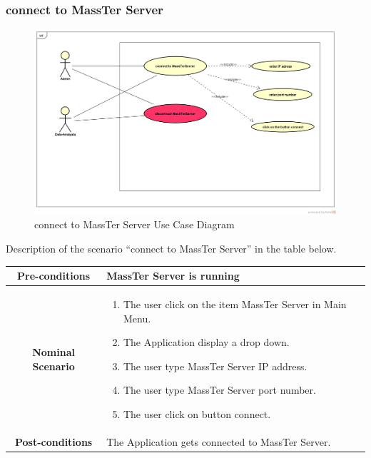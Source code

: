 \documentclass[12pt]{article}
\begin{document}
	 \subsubsection{connect to MassTer Server}
	 	\begin{figure}[h]
	 	\centering
	 	\includegraphics[width=1.0\textwidth]{connectToMassTerServer.png}
	 	\caption{connect to MassTer Server Use Case Diagram}
	 	
	 \end{figure}

  \newpage
 
 Description of the scenario ``connect to MassTer Server'' in the table below. 
 \\
 
 \begin{table}
 	\centering
 	\begin{tabular}{|c|p{10cm}|}
 		\hline 	
 		\textbf{Pre-conditions } & MassTer Server is running  \\ 
 		\hline                     
 		\textbf{Nominal Scenario } & \begin{enumerate}
 			\item The user click on the item MassTer Server in Main Menu.
 			\item The Application display a drop down. 
 			\item The user type MassTer Server IP address.
 			\item The user type MassTer Server port number.
 			\item The  user click on button connect. 
 		\end{enumerate} \\ 
 		\hline 
 		\textbf{Post-conditions} & The Application gets connected to MassTer Server. \\
 		\hline 
 	\end{tabular}
 \end{table}
\end{document}
